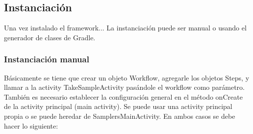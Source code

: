 \subsection{Instanciación}
Una vez instalado el framework...
La instanciación puede ser manual o usando el generador de clases de Gradle.

\subsubsection{Instanciación manual}
Básicamente se tiene que crear un objeto Workflow, agregarle los objetos Steps, y llamar a la activity TakeSampleActivity pasándole el workflow como parámetro.
También es necesario establecer la configuración general en el método onCreate de la activity principal (main activity).
Se puede usar una activity principal propia o se puede heredar de SamplersMainActivity. En ambos casos se debe hacer lo siguiente:
